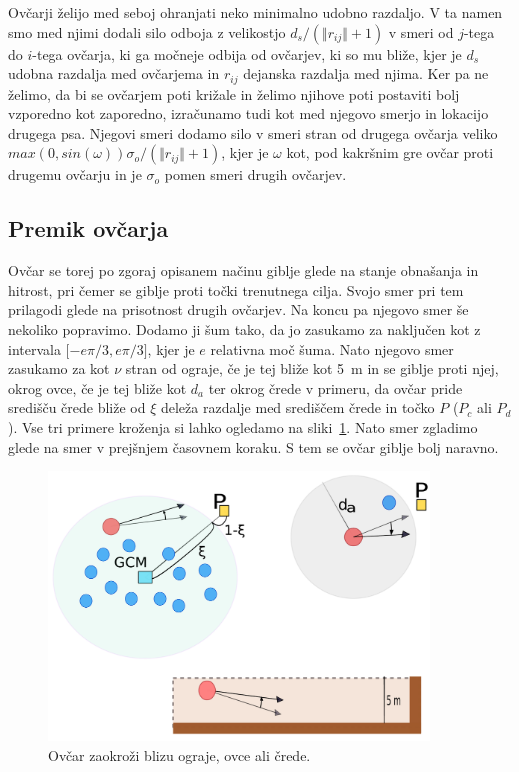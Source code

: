 Ovčarji želijo med seboj ohranjati neko minimalno udobno razdaljo. V ta namen smo med njimi dodali silo odboja z velikostjo $d_s / (\Vert r_{ij}\Vert + 1)$ v smeri od $j$-tega do $i$-tega ovčarja, ki ga močneje odbija od ovčarjev, ki so mu bliže, kjer je $d_s$ udobna razdalja med ovčarjema in $r_{ij}$ dejanska razdalja med njima. Ker pa ne želimo, da bi se ovčarjem poti križale in želimo njihove poti postaviti bolj vzporedno kot zaporedno, izračunamo tudi kot med njegovo smerjo in lokacijo drugega psa. Njegovi smeri dodamo silo v smeri stran od drugega ovčarja veliko $max(0, sin(\omega)) \sigma_o / (\Vert r_{ij}\Vert + 1)$, kjer je $\omega$ kot, pod kakršnim gre ovčar proti drugemu ovčarju in je $\sigma_o$ pomen smeri drugih ovčarjev.

\subsection{Premik ovčarja}

Ovčar se torej po zgoraj opisanem načinu giblje glede na stanje obnašanja in hitrost, pri čemer se giblje proti točki trenutnega cilja. Svojo smer pri tem prilagodi glede na prisotnost drugih ovčarjev. Na koncu pa njegovo smer še nekoliko popravimo. Dodamo ji šum tako, da jo zasukamo za naključen kot z intervala $\lbrack -e\pi/3, e\pi/3\rbrack$, kjer je $e$ relativna moč šuma. Nato njegovo smer zasukamo za kot $\nu$ stran od ograje, če je tej bliže kot 5~m in se giblje proti njej, okrog ovce, če je tej bliže kot $d_a$ ter okrog črede v primeru, da ovčar pride središču črede bliže od $\xi$ deleža razdalje med središčem črede in točko $P$ ($P_c$ ali $P_d$). Vse tri primere kroženja si lahko ogledamo na sliki~\ref{fig:zaokrozi}. Nato smer zgladimo glede na smer v prejšnjem časovnem koraku. S tem se ovčar giblje bolj naravno.

\begin{figure}[ht]  %
	\centering
	\includegraphics[width=0.9\textwidth]{../poglavja/images/zaokrozi.pdf}
	\caption[Izogibanje ograji, zaokrožanje okrog ovce in okrog črede]{Ovčar zaokroži blizu ograje, ovce ali črede.} %
	\label{fig:zaokrozi}
\end{figure}

